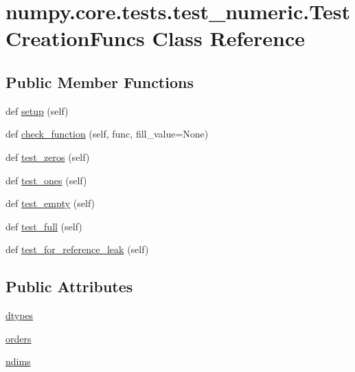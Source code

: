 \hypertarget{classnumpy_1_1core_1_1tests_1_1test__numeric_1_1TestCreationFuncs}{}\section{numpy.\+core.\+tests.\+test\+\_\+numeric.\+Test\+Creation\+Funcs Class Reference}
\label{classnumpy_1_1core_1_1tests_1_1test__numeric_1_1TestCreationFuncs}
\subsection*{Public Member Functions}
\begin{DoxyCompactItemize}
\item 
def \hyperlink{classnumpy_1_1core_1_1tests_1_1test__numeric_1_1TestCreationFuncs_ad8e5969d91f121eea651b305f6e9d977}{setup} (self)
\item 
def \hyperlink{classnumpy_1_1core_1_1tests_1_1test__numeric_1_1TestCreationFuncs_a1e78fec68869e1052823feaa52e789b0}{check\+\_\+function} (self, func, fill\+\_\+value=None)
\item 
def \hyperlink{classnumpy_1_1core_1_1tests_1_1test__numeric_1_1TestCreationFuncs_ad701d29eb17367d661e5b3fd05bbf1be}{test\+\_\+zeros} (self)
\item 
def \hyperlink{classnumpy_1_1core_1_1tests_1_1test__numeric_1_1TestCreationFuncs_adac7dfddcd0ea97885d84ea300a18250}{test\+\_\+ones} (self)
\item 
def \hyperlink{classnumpy_1_1core_1_1tests_1_1test__numeric_1_1TestCreationFuncs_a863541133d8ebe815ac72f2168884d17}{test\+\_\+empty} (self)
\item 
def \hyperlink{classnumpy_1_1core_1_1tests_1_1test__numeric_1_1TestCreationFuncs_abea6b37160ff09c9fef38ae7b1323218}{test\+\_\+full} (self)
\item 
def \hyperlink{classnumpy_1_1core_1_1tests_1_1test__numeric_1_1TestCreationFuncs_a48655c48fcd13cec26c104c46b4bc24a}{test\+\_\+for\+\_\+reference\+\_\+leak} (self)
\end{DoxyCompactItemize}
\subsection*{Public Attributes}
\begin{DoxyCompactItemize}
\item 
\hyperlink{classnumpy_1_1core_1_1tests_1_1test__numeric_1_1TestCreationFuncs_a44cc9409627e9aa9d5d3d36d2f30532f}{dtypes}
\item 
\hyperlink{classnumpy_1_1core_1_1tests_1_1test__numeric_1_1TestCreationFuncs_a3c00031d7f7293aee1f6bf81ac7ac8a6}{orders}
\item 
\hyperlink{classnumpy_1_1core_1_1tests_1_1test__numeric_1_1TestCreationFuncs_a2d39f16fea559461027e31cb4db74327}{ndims}
\end{DoxyCompactItemize}
